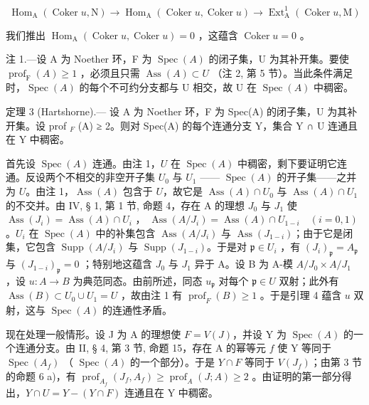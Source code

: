 \[
\operatorname{Hom} _ {\mathrm{A}} (\operatorname{Coker} u, \mathrm{N}) \rightarrow \operatorname{Hom} _ {\mathrm{A}} (\operatorname{Coker} u, \operatorname{Coker} u) \rightarrow \operatorname{Ext} _ {\mathrm{A}} ^ {1} (\operatorname{Coker} u, \mathrm{M})
\]

我们推出 \(\operatorname{Hom}_{\mathrm{A}}(\operatorname{Coker} u, \operatorname{Coker} u) = 0\) ，这蕴含 \(\operatorname{Coker} u = 0\) 。

注 1.—设 A 为 Noether 环，F 为 \(\operatorname{Spec}(A)\) 的闭子集，U 为其补开集。要使 \(\operatorname{prof}_{\mathrm{F}}(A) \geqslant 1\) ，必须且只需 \(\operatorname{Ass}(A) \subset U\) （注 2, 第 5 节）。当此条件满足时，\(\operatorname{Spec}(A)\) 的每个不可约分支都与 U 相交，故 U 在 \(\operatorname{Spec}(A)\) 中稠密。

定理 3 (Hartshorne).--- 设 A 为 Noether 环，F 为 Spec(A) 的闭子集，U 为其补开集。设 prof \(_{F}\) (A) ≥ 2。则对 Spec(A) 的每个连通分支 Y，集合 Y ∩ U 连通且在 Y 中稠密。

首先设 \(\operatorname{Spec}(A)\) 连通。由注 1，\(U\) 在 \(\operatorname{Spec}(A)\) 中稠密，剩下要证明它连通。反设两个不相交的非空开子集 \(U_0\) 与 \(U_1\) —— \(\operatorname{Spec}(A)\) 的开子集——之并为 \(U\)。由注 1，\(\operatorname{Ass}(A)\) 包含于 \(U\)，故它是 \(\operatorname{Ass}(A) \cap U_0\) 与 \(\operatorname{Ass}(A) \cap U_1\) 的不交并。由 IV, § 1, 第 1 节, 命题 4，存在 A 的理想 \(J_0\) 与 \(J_1\) 使 \(\operatorname{Ass}(J_i) = \operatorname{Ass}(A) \cap U_i\) ， \(\operatorname{Ass}(A/J_i) = \operatorname{Ass}(A) \cap U_{1-i}\quad (i=0,1)\) 。\(U_i\) 在 \(\operatorname{Spec}(A)\) 中的补集包含 \(\operatorname{Ass}(A/J_i)\) 与 \(\operatorname{Ass}(J_{1-i})\)；由于它是闭集，它包含 \(\operatorname{Supp}(A/J_i)\) 与 \(\operatorname{Supp}(J_{1-i})\)。于是对 \(\mathfrak{p} \in U_i\) ，有 \((J_i)_{\mathfrak{p}} = A_{\mathfrak{p}}\) 与 \((J_{1-i})_{\mathfrak{p}} = 0\) ；特别地这蕴含 \(J_0\) 与 \(J_1\) 异于 A。设 B 为 A-模 \(A/J_0 \times A/J_1\) ，设 \(u: A \to B\) 为典范同态。由前所述，同态 \(u_{\mathfrak{p}}\) 对每个 \(\mathfrak{p} \in U\) 双射；此外有 \(\operatorname{Ass}(B) \subset U_0 \cup U_1 = U\) ，故由注 1 有 \(\operatorname{prof}_F(B) \geqslant 1\) 。于是引理 4 蕴含 \(u\) 双射，这与 \(\operatorname{Spec}(A)\) 的连通性矛盾。

现在处理一般情形。设 J 为 A 的理想使 \(F = V(J)\)，并设 Y 为 \(\operatorname{Spec}(A)\) 的一个连通分支。由 II, § 4, 第 3 节, 命题 15，存在 A 的幂等元 \(f\) 使 Y 等同于 \(\operatorname{Spec}(A_f)\) （ \(\operatorname{Spec}(A)\) 的一个部分）。于是 \(Y \cap F\) 等同于 \(V(J_f)\)；由第 3 节的命题 6 a)，有 \(\operatorname{prof}_{A_f}(J_f, A_f) \geqslant \operatorname{prof}_A(J; A) \geqslant 2\) 。由证明的第一部分得出，\(Y \cap U = Y - (Y \cap F)\) 连通且在 Y 中稠密。

